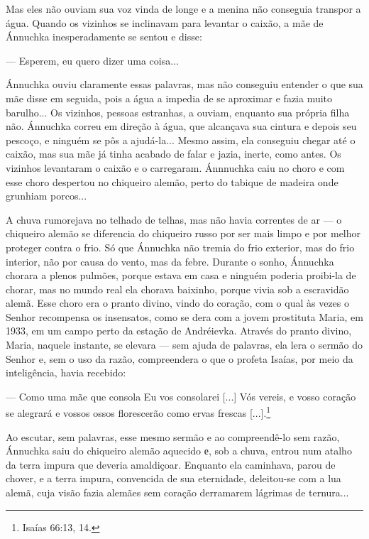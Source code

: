 Mas eles não ouviam sua voz vinda de longe e a menina não conseguia
transpor a água. Quando os vizinhos se inclinavam para levantar o
caixão, a mãe de Ánnuchka inesperadamente se sentou e disse:

--- Esperem, eu quero dizer uma coisa...

Ánnuchka ouviu claramente essas palavras, mas não conseguiu entender o
que sua mãe disse em seguida, pois a água a impedia de se aproximar e
fazia muito barulho... Os vizinhos, pessoas estranhas, a ouviam,
enquanto sua própria filha não. Ánnuchka correu em direção à água, que
alcançava sua cintura e depois seu pescoço, e ninguém se pôs a
ajudá-la... Mesmo assim, ela conseguiu chegar até o caixão, mas sua mãe
já tinha acabado de falar e jazia, inerte, como antes. Os vizinhos
levantaram o caixão e o carregaram. Ánnnuchka caiu no choro e com esse
choro despertou no chiqueiro alemão, perto do tabique de madeira onde
grunhiam porcos...

A chuva rumorejava no telhado de telhas, mas não havia correntes de ar
--- o chiqueiro alemão se diferencia do chiqueiro russo por ser mais
limpo e por melhor proteger contra o frio. Só que Ánnuchka não tremia do
frio exterior, mas do frio interior, não por causa do vento, mas da
febre. Durante o sonho, Ánnuchka chorara a plenos pulmões, porque estava
em casa e ninguém poderia proibi-la de chorar, mas no mundo real ela
chorava baixinho, porque vivia sob a escravidão alemã. Esse choro era o
pranto divino, vindo do coração, com o qual às vezes o Senhor recompensa
os insensatos, como se dera com a jovem prostituta Maria, em 1933, em um
campo perto da estação de Andréievka. Através do pranto divino, Maria,
naquele instante, se elevara --- sem ajuda de palavras, ela lera o
sermão do Senhor e, sem o uso da razão, compreendera o que o profeta
Isaías, por meio da inteligência, havia recebido:

--- Como uma mãe que consola Eu vos consolarei {[}...{]} Vós vereis, e
vosso coração se alegrará e vossos ossos florescerão como ervas frescas
{[}...{]}.\footnote{Isaías 66:13, 14.}

Ao escutar, sem palavras, esse mesmo sermão e ao compreendê-lo sem
razão, Ánnuchka saiu do chiqueiro alemão aquecido е, sob a chuva, entrou
num atalho da terra impura que deveria amaldiçoar. Enquanto ela
caminhava, parou de chover, e a terra impura, convencida de sua
eternidade, deleitou-se com a lua alemã, cuja visão fazia alemães sem
coração derramarem lágrimas de ternura...

